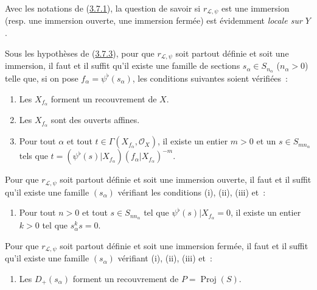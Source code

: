 \begin{env}[3.8.1]
\label{II.3.8.1-fr}
Avec les notations de (\hyperref[II.3.7.1-fr]{3.7.1}), la question de savoir
si $r_{\mathcal{L},\psi}$ est une immersion (resp. une immersion ouverte, une
immersion fermée) est évidemment \emph{locale sur $Y$}.
\end{env}

\begin{proposition}[3.8.2]
\label{II.3.8.2-fr}
Sous les hypothèses de (\hyperref[II.3.7.3-fr]{3.7.3}), pour que
$r_{\mathcal{L},\psi}$ soit partout définie et soit une immersion, il faut et
il suffit qu'il existe une famille de sections $s_\alpha\in S_{n_\alpha}$
($n_\alpha>0$) telle que, si on pose
$f_\alpha=\psi^\flat(s_\alpha)$, les conditions suivantes soient vérifiées~:
\begin{enumerate}
  \item[(i)] Les $X_{f_\alpha}$ forment un recouvrement de $X$.
  \item[(ii)] Les $X_{f_\alpha}$ sont des ouverts affines.
  \item[(iii)] Pour tout $\alpha$ et tout
    $t\in\Gamma(X_{f_\alpha},\mathcal{O}_X)$, il existe un entier $m>0$ et
    un $s\in S_{mn_\alpha}$ tels que
    $t=(\psi^\flat(s)|X_{f_\alpha})(f_\alpha|X_{f_\alpha})^{-m}$.
\end{enumerate}

Pour que $r_{\mathcal{L},\psi}$ soit partout définie et soit une immersion
ouverte, il faut et il suffit qu'il existe une famille $(s_\alpha)$ vérifiant
les conditions (i), (ii), (iii) et~:
\begin{enumerate}
  \item[(iv)] Pour tout $n>0$ et tout $s\in S_{nn_\alpha}$ tel que
    $\psi^\flat(s)|X_{f_\alpha}=0$, il existe un entier $k>0$ tel que
    $s_\alpha^ks=0$.
\end{enumerate}

Pour que $r_{\mathcal{L},\psi}$ soit partout définie et soit une immersion
fermée, il faut et il suffit qu'il existe une famille $(s_\alpha)$ vérifiant
(i), (ii), (iii) et~:
\begin{enumerate}
  \item[(v)] Les $D_+(s_\alpha)$ forment un recouvrement de
    $P=\operatorname{Proj}(S)$.
\end{enumerate}
\end{proposition}

